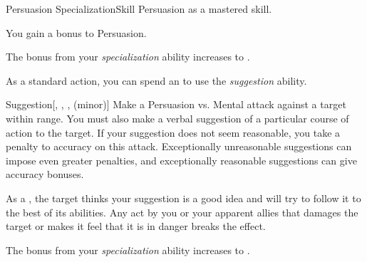     \begin{feat}{Persuasion Specialization}{Skill}
        \featpre Persuasion as a mastered skill.

        \ff{}

         You gain a  bonus to Persuasion.

         The bonus from your \textit{specialization} ability increases to .

         As a standard action, you can spend an  to use the \textit{suggestion} ability.
        \begin{ability}{Suggestion}[, , ,  (minor)]
            Make a Persuasion vs. Mental attack against a target within \rngmed range.
            You must also make a verbal suggestion of a particular course of action to the target.
            If your suggestion does not seem reasonable, you take a  penalty to accuracy on this attack.
            Exceptionally unreasonable suggestions can impose even greater penalties, and exceptionally reasonable suggestions can give accuracy bonuses.

            \hit As a , the target thinks your suggestion is a good idea and will try to follow it to the best of its abilities.
            Any act by you or your apparent allies that damages the target or makes it feel that it is in danger breaks the effect.

        \end{ability}

         The bonus from your \textit{specialization} ability increases to .
    \end{feat}

